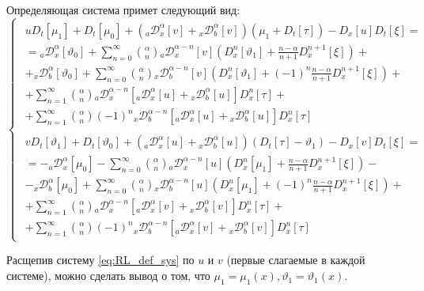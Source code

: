 \documentclass[a4paper, fontsize=14pt]{article}
\newcommand{\RLD}[3]{{}_{#1}\mathcal{D}_{#2}^{\alpha} \left[#3\right]} %
\newcommand{\D}[3]{D_{#1}^{#2} \left[ #3 \right]} %
\newcommand{\RLDa}[4]{{}_{#1}\mathcal{D}_{#2}^{#4} \left[#3\right]} %
\begin{document}
Определяющая система примет следующий вид:
\begin{equation}
  \label{eq:RL_def_sys}
  \begin{cases}
    \begin{aligned}
      u \D{t}{}{\mu_1} + \D{t}{}{\mu_0} + \left(\RLD{a}{x}{v} + \RLD{x}{b}{v}\right) \left(\mu_1 + \D{t}{}{\tau} \right) -  \D{x}{}{u} \D{t}{}{\xi} = \\
      = \RLD{a}{x}{\vartheta _0} + \sum_{n=0}^{\infty} \binom{\alpha}{n} \RLDa{a}{x}{v}{\alpha - n}  \left( \D{x}{n}{\vartheta _1} + \frac{n-\alpha}{n+1} \D{x}{n+1}{\xi} \right)+ \\
      + \RLD{x}{b}{\vartheta _0} + \sum_{n=0}^{\infty} \binom{\alpha}{n} \RLDa{x}{b}{v}{\alpha - n} \left( \D{x}{n}{\vartheta _1} + (-1)^n \frac{n-\alpha}{n+1}  \D{x}{n+1}{\xi} \right)+ \\
      + \sum_{n=1}^{\infty} \binom{\alpha}{n} \RLDa{a}{x}{\RLD{a}{x}{u} + \RLD{x}{b}{u}}{\alpha-n} \D{x}{n}{\tau} + \\
      + \sum_{n=1}^{\infty} \binom{\alpha}{n} (-1)^n \RLDa{x}{b}{\RLD{a}{x}{u} + \RLD{x}{b}{u}}{\alpha-n} \D{x}{n}{\tau}
    \end{aligned} \\

    \begin{aligned}
      v \D{t}{}{\vartheta _1} + \D{t}{}{\vartheta _0} + \left(\RLD{a}{x}{u} + \RLD{x}{b}{u}\right) \left(\D{t}{}{\tau} - \vartheta _1 \right) -  \D{x}{}{v} \D{t}{}{\xi} = \\
      = - \RLD{a}{x}{\mu_0} - \sum_{n=0}^{\infty} \binom{\alpha}{n} \RLDa{a}{x}{u}{\alpha - n}  \left( \D{x}{n}{\mu_1} + \frac{n-\alpha}{n+1} \D{x}{n+1}{\xi} \right)- \\
      - \RLD{x}{b}{\mu_0} + \sum_{n=0}^{\infty} \binom{\alpha}{n} \RLDa{x}{b}{u}{\alpha - n} \left( \D{x}{n}{\mu_1} + (-1)^n \frac{n-\alpha}{n+1}  \D{x}{n+1}{\xi} \right)+ \\
      + \sum_{n=1}^{\infty} \binom{\alpha}{n} \RLDa{a}{x}{\RLD{a}{x}{v} + \RLD{x}{b}{v}}{\alpha-n} \D{x}{n}{\tau} + \\
      + \sum_{n=1}^{\infty} \binom{\alpha}{n} (-1)^n \RLDa{x}{b}{\RLD{a}{x}{v} + \RLD{x}{b}{v}}{\alpha-n} \D{x}{n}{\tau}
    \end{aligned}
  \end{cases}
\end{equation}

Расщепив систему \eqref{eq:RL_def_sys} по $u$ и $v$ (первые слагаемые в каждой системе), можно сделать вывод о том, что $\mu_1 = \mu_1(x), \vartheta _1 = \vartheta _1(x)$.
\end{document}
